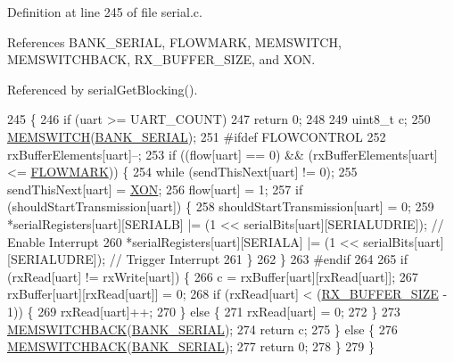 Definition at line 245 of file serial.\-c.



References B\-A\-N\-K\-\_\-\-S\-E\-R\-I\-A\-L, F\-L\-O\-W\-M\-A\-R\-K, M\-E\-M\-S\-W\-I\-T\-C\-H, M\-E\-M\-S\-W\-I\-T\-C\-H\-B\-A\-C\-K, R\-X\-\_\-\-B\-U\-F\-F\-E\-R\-\_\-\-S\-I\-Z\-E, and X\-O\-N.



Referenced by serial\-Get\-Blocking().


\begin{DoxyCode}
245                                 \{
246     \textcolor{keywordflow}{if} (uart >= UART\_COUNT)
247         \textcolor{keywordflow}{return} 0;
248 
249     uint8\_t c;
250     \hyperlink{group__xmem_ga253830e5022f2aa99177acd8a0ba0bfe}{MEMSWITCH}(\hyperlink{group__xmem_gaa5177871b2303418ed492a18405273f9}{BANK\_SERIAL});
251 \textcolor{preprocessor}{#ifdef FLOWCONTROL}
252 \textcolor{preprocessor}{}    rxBufferElements[uart]--;
253     \textcolor{keywordflow}{if} ((flow[uart] == 0) && (rxBufferElements[uart] <= \hyperlink{group__uart_gaa7907a070ef8e6d68d7d774b34eebe66}{FLOWMARK})) \{
254         \textcolor{keywordflow}{while} (sendThisNext[uart] != 0);
255         sendThisNext[uart] = \hyperlink{group__uart_gacdf721774c51e08c6609e6fa8cf82cc9}{XON};
256         flow[uart] = 1;
257         \textcolor{keywordflow}{if} (shouldStartTransmission[uart]) \{
258             shouldStartTransmission[uart] = 0;
259             *serialRegisters[uart][SERIALB] |= (1 << serialBits[uart][SERIALUDRIE]); \textcolor{comment}{// Enable Interrupt}
260             *serialRegisters[uart][SERIALA] |= (1 << serialBits[uart][SERIALUDRE]); \textcolor{comment}{// Trigger Interrupt}
261         \}
262     \}
263 \textcolor{preprocessor}{#endif}
264 \textcolor{preprocessor}{}
265     \textcolor{keywordflow}{if} (rxRead[uart] != rxWrite[uart]) \{
266         c = rxBuffer[uart][rxRead[uart]];
267         rxBuffer[uart][rxRead[uart]] = 0;
268         \textcolor{keywordflow}{if} (rxRead[uart] < (\hyperlink{group__uart_ga739a2a1a0047c98ac1b18ecd25dac092}{RX\_BUFFER\_SIZE} - 1)) \{
269             rxRead[uart]++;
270         \} \textcolor{keywordflow}{else} \{
271             rxRead[uart] = 0;
272         \}
273         \hyperlink{group__xmem_ga96199c8c5e6fbc65dd60aa67de63fd34}{MEMSWITCHBACK}(\hyperlink{group__xmem_gaa5177871b2303418ed492a18405273f9}{BANK\_SERIAL});
274         \textcolor{keywordflow}{return} c;
275     \} \textcolor{keywordflow}{else} \{
276         \hyperlink{group__xmem_ga96199c8c5e6fbc65dd60aa67de63fd34}{MEMSWITCHBACK}(\hyperlink{group__xmem_gaa5177871b2303418ed492a18405273f9}{BANK\_SERIAL});
277         \textcolor{keywordflow}{return} 0;
278     \}
279 \}
\end{DoxyCode}

